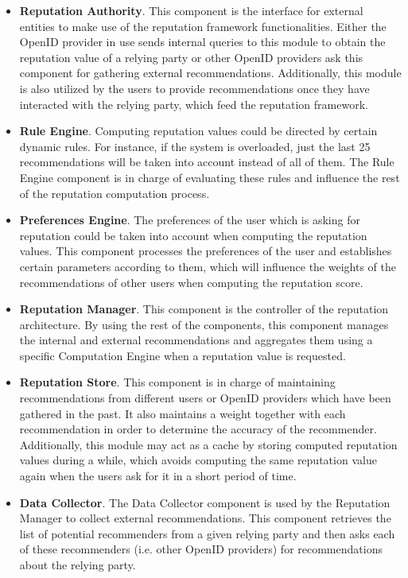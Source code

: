 \documentclass{llncs}
\begin{document}
\begin{itemize}

\item \textbf{Reputation Authority}. This component is the interface for external entities to make use of the reputation framework functionalities. Either the OpenID provider in use sends internal queries to this module to obtain the reputation value of a relying party or other OpenID providers ask this component for gathering external recommendations. Additionally, this module is also utilized by the users to provide recommendations once they have interacted with the relying party, which feed the reputation framework.

\item \textbf{Rule Engine}. Computing reputation values could be directed by certain dynamic rules. For instance, if the system is overloaded, just the last 25 recommendations will be taken into account instead of all of them. The Rule Engine component is in charge of evaluating these rules and influence the rest of the reputation computation process. 

\item \textbf{Preferences Engine}. The preferences of the user which is asking for reputation could be taken into account when computing the reputation values. This component processes the preferences of the user and establishes certain parameters according to them, which will influence the weights of the recommendations of other users when computing the reputation score.

\item \textbf{Reputation Manager}. This component is the controller of the reputation architecture. By using the rest of the components, this component manages the internal and external recommendations and aggregates them using a specific Computation Engine when a reputation value is requested.

\item \textbf{Reputation Store}. This component is in charge of maintaining recommendations from different users or OpenID providers which have been gathered in the past. It also maintains a weight together with each recommendation in order to determine the accuracy of the recommender. Additionally, this module may act as a cache by storing computed reputation values during a while, which avoids computing the same reputation value again when the users ask for it in a short period of time.

\item \textbf{Data Collector}. The Data Collector component is used by the Reputation Manager to collect external recommendations. This component retrieves the list of potential recommenders from a given relying party and then asks each of these recommenders (i.e. other OpenID providers) for recommendations about the relying party.



\end{itemize}
\end{document}
